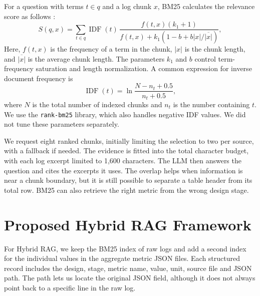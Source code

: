 \documentclass[11pt,a4paper]{article}
\newcommand{\code}[1]{\texttt{#1}}
\begin{document}
For a question with terms $t\in q$ and a log chunk $x$, BM25 calculates the relevance score as follows \cite{bm25}:
\begin{equation}
S(q,x)=\sum_{t\in q}\operatorname{IDF}(t)\,
\frac{f(t,x)(k_1+1)}{f(t,x)+k_1(1-b+b|x|/\overline{|x|})},
\end{equation}
Here, $f(t,x)$ is the frequency of a term in the chunk, $|x|$ is the chunk length, and $\overline{|x|}$ is the average chunk length. The parameters $k_1$ and $b$ control term-frequency saturation and length normalization. A common expression for inverse document frequency is
\begin{equation}
\operatorname{IDF}(t)=\ln\frac{N-n_t+0.5}{n_t+0.5},
\end{equation}
where $N$ is the total number of indexed chunks and $n_t$ is the number containing $t$. We use the \code{rank-bm25} library, which also handles negative IDF values. We did not tune these parameters separately.

We request eight ranked chunks, initially limiting the selection to two per source, with a fallback if needed. The evidence is fitted into the total character budget, with each log excerpt limited to 1,600 characters. The LLM then answers the question and cites the excerpts it uses. The overlap helps when information is near a chunk boundary, but it is still possible to separate a table header from its total row. BM25 can also retrieve the right metric from the wrong design stage.
\newpage
\section{Proposed Hybrid RAG Framework}
For Hybrid RAG, we keep the BM25 index of raw logs and add a second index for the individual values in the aggregate metric JSON files. Each structured record includes the design, stage, metric name, value, unit, source file and JSON path. The path lets us locate the original JSON field, although it does not always point back to a specific line in the raw log.
\end{document}
